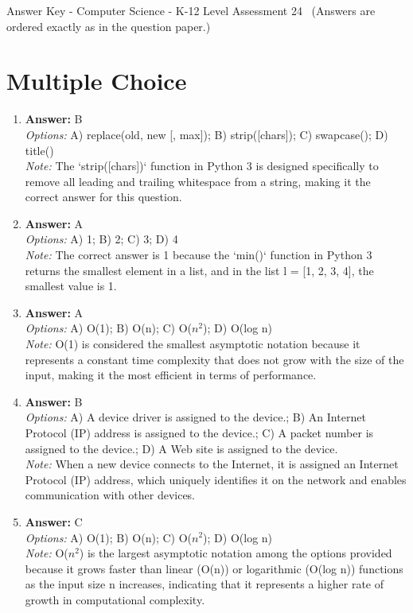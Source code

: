 \documentclass[12pt]{article}
\begin{document}
\begin{center}
Answer Key - Computer Science - K-12 Level Assessment 24 \
\small (Answers are ordered exactly as in the question paper.)
\end{center}

\section*{Multiple Choice}
\begin{enumerate}[label=\arabic*.]
\item \textbf{Answer:} B
\\ \textit{Options:} A) replace(old, new [, max]); B) strip([chars]); C) swapcase(); D) title()
\\ \textit{Note:} The `strip([chars])` function in Python 3 is designed specifically to remove all leading and trailing whitespace from a string, making it the correct answer for this question.
\item \textbf{Answer:} A
\\ \textit{Options:} A) 1; B) 2; C) 3; D) 4
\\ \textit{Note:} The correct answer is 1 because the `min()` function in Python 3 returns the smallest element in a list, and in the list l = [1, 2, 3, 4], the smallest value is 1.
\item \textbf{Answer:} A
\\ \textit{Options:} A) O(1); B) O(n); C) O($n^2$); D) O(log n)
\\ \textit{Note:} O(1) is considered the smallest asymptotic notation because it represents a constant time complexity that does not grow with the size of the input, making it the most efficient in terms of performance.
\item \textbf{Answer:} B
\\ \textit{Options:} A) A device driver is assigned to the device.; B) An Internet Protocol (IP) address is assigned to the device.; C) A packet number is assigned to the device.; D) A Web site is assigned to the device.
\\ \textit{Note:} When a new device connects to the Internet, it is assigned an Internet Protocol (IP) address, which uniquely identifies it on the network and enables communication with other devices.
\item \textbf{Answer:} C
\\ \textit{Options:} A) O(1); B) O(n); C) O($n^2$); D) O(log n)
\\ \textit{Note:} O($n^2$) is the largest asymptotic notation among the options provided because it grows faster than linear (O(n)) or logarithmic (O(log n)) functions as the input size n increases, indicating that it represents a higher rate of growth in computational complexity.
\end{enumerate}
\end{document}
